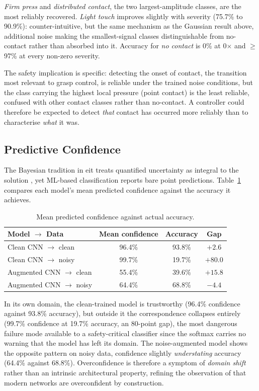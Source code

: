 \emph{Firm press} and \emph{distributed contact}, the two largest-amplitude classes, are the most reliably recovered. \emph{Light touch} improves slightly with severity (75.7\% to 90.9\%): counter-intuitive, but the same mechanism as the Gaussian result above, additional noise making the smallest-signal classes distinguishable from no-contact rather than absorbed into it. Accuracy for \emph{no contact} is 0\% at 0$\times$ and $\geq$97\% at every non-zero severity.

The safety implication is specific: detecting the onset of contact, the transition most relevant to grasp control, is reliable under the trained noise conditions, but the class carrying the highest local pressure (point contact) is the least reliable, confused with other contact classes rather than no-contact. A controller could therefore be expected to detect \emph{that} contact has occurred more reliably than to characterise \emph{what} it was.

\subsection{Predictive Confidence}
\label{sec:res-calibration}

The Bayesian tradition in \gls{eit} treats quantified uncertainty as integral to the solution \parencite{kaipio2005statistical}, yet ML-based classification reports bare point predictions. Table~\ref{tab:calibration} compares each model's mean predicted confidence against the accuracy it achieves.

\begin{table}[htbp]
\centering
\caption[Mean predicted confidence against actual accuracy]{Mean predicted confidence against actual accuracy.}
\label{tab:calibration}
\small
\begin{tabular}{@{}lccc@{}}
\toprule
\textbf{Model $\to$ Data} & \textbf{Mean confidence} & \textbf{Accuracy} & \textbf{Gap} \\
\midrule
Clean CNN $\to$ clean      & 96.4\% & 93.8\% & $+2.6$ \\
Clean CNN $\to$ noisy      & 99.7\% & 19.7\% & $\mathbf{+80.0}$ \\
Augmented CNN $\to$ clean  & 55.4\% & 39.6\% & $+15.8$ \\
Augmented CNN $\to$ noisy  & 64.4\% & 68.8\% & $-4.4$ \\
\bottomrule
\end{tabular}
\end{table}

In its own domain, the clean-trained model is trustworthy (96.4\% confidence against 93.8\% accuracy), but outside it the correspondence collapses entirely (99.7\% confidence at 19.7\% accuracy, an 80-point gap), the most dangerous failure mode available to a safety-critical classifier since the softmax carries no warning that the model has left its domain. The noise-augmented model shows the opposite pattern on noisy data, confidence slightly \emph{understating} accuracy (64.4\% against 68.8\%). Overconfidence is therefore a symptom of \emph{domain shift} rather than an intrinsic architectural property, refining the observation of \textcite{guo2017calibration} that modern networks are overconfident by construction.

